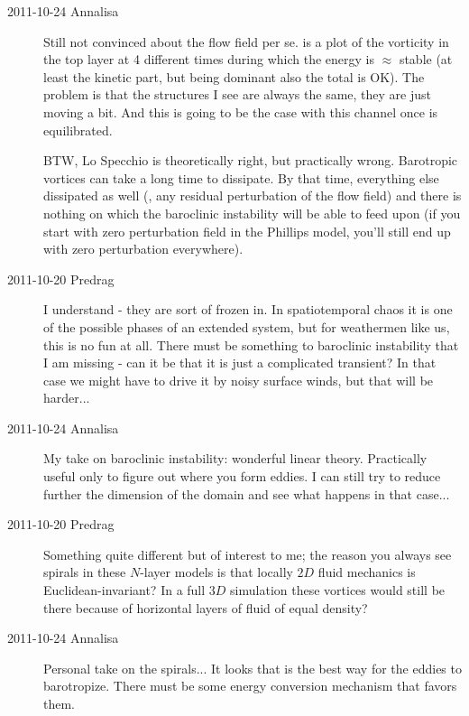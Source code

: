 \begin{description}
\item[2011-10-24 Annalisa]
Still not convinced about the flow field per se. 
is a plot of the vorticity in the top layer at 4 different times during
which the energy is $\approx$ stable (at least the kinetic part, but
being dominant also the total is OK). The problem is that the structures I
see are always the same, they are just moving a bit. And this is going to
be the case with this channel once is equilibrated.

BTW, Lo Specchio  is theoretically right, but practically wrong.
Barotropic vortices can take a long time to dissipate. By that time,
everything else dissipated as well (\ie, any residual perturbation of the
flow field) and there is nothing on which the baroclinic instability will
be able to feed upon (if you start with zero perturbation field in the
Phillips model, you'll still end up with zero perturbation everywhere).

\item[2011-10-20 Predrag] I understand - they are sort of frozen in. In
spatiotemporal chaos it is one of the possible phases of an extended
system, but for weathermen like us, this is no fun at all. There must be
something to baroclinic instability that I am missing - can it be that it
is just a complicated transient? In that case we might have to drive it
by noisy surface winds, but that will be harder...

\item[2011-10-24 Annalisa]
My take on baroclinic instability: wonderful linear theory. Practically
useful only to figure out where you form eddies. I can still try to
reduce further the dimension of the domain and see what happens in that
case...

\item[2011-10-20 Predrag] Something quite different but of interest to me;
the reason you always see spirals in these $N$-layer models is that locally
$2D$ fluid mechanics is Euclidean-invariant? In a full $3D$ simulation these
vortices would still be there because of horizontal layers of fluid of equal density?

\item[2011-10-24 Annalisa]
Personal take on the spirals... It looks that is the best way for the
eddies to barotropize. There must be some energy conversion mechanism
that favors them.

\end{description}
